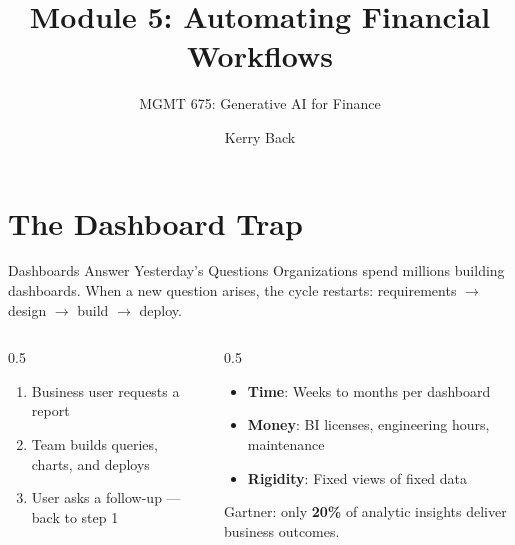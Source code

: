\documentclass[aspectratio=169]{beamer}
\subtitle{MGMT 675: Generative AI for Finance}
\title{Module 5: Automating Financial Workflows}
\author{Kerry Back}
\date{}
\begin{document}
\maketitle

\section{The Dashboard Trap}

\begin{frame}{Dashboards Answer Yesterday's Questions}
Organizations spend millions building dashboards. When a new question arises, the cycle restarts: requirements $\rightarrow$ design $\rightarrow$ build $\rightarrow$ deploy.
\vspace{0.3cm}
\begin{columns}[T]
\begin{column}{0.5\textwidth}
\begin{shadedbox}[title=\textbf{The Typical Dashboard Lifecycle}]
\begin{enumerate}\small
  \item Business user requests a report
  \item Team builds queries, charts, and deploys
  \item User asks a follow-up --- \alert{back to step 1}
\end{enumerate}
\end{shadedbox}
\end{column}
\begin{column}{0.5\textwidth}
\begin{shadedbox}[title=\textbf{The Cost}]
\begin{itemize}\small
  \item \textbf{Time}: Weeks to months per dashboard
  \item \textbf{Money}: BI licenses, engineering hours, maintenance
  \item \textbf{Rigidity}: Fixed views of fixed data
\end{itemize}
\end{shadedbox}
\vspace{0.2cm}
Gartner: only \textbf{20\%} of analytic insights deliver business outcomes.
\end{column}
\end{columns}
\end{frame}
\end{document}
